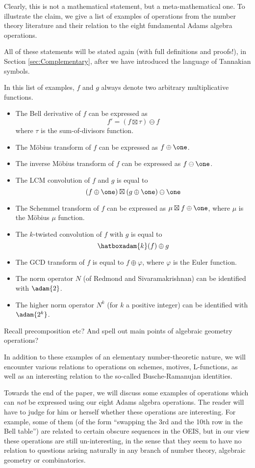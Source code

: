 \documentclass[a4paper]{article}
\begin{document}
Clearly, this is not a mathematical statement, but a meta-mathematical one. To illustrate the claim, we give a list of examples of operations from the number theory literature and their relation to the eight fundamental Adams algebra operations. 

All of these statements will be stated again (with full definitions and proofs!), in Section \ref{sec:Complementary}, after we have introduced the language of Tannakian symbols.

In this list of examples, $f$ and $g$ always denote two arbitrary multiplicative functions.
\begin{itemize}
\item The Bell derivative of $f$ can be expressed as
$$   f' = (f \boxtimes \tau) \ominus  f  $$  
where $\tau$ is the sum-of-divisors function.
\item The M{\"o}bius transform of $f$ can be expressed as $f \oplus \one$.
\item The inverse M{\"o}bius transform of $f$ can be expressed as $f \ominus \one$.
\item The LCM convolution of $f$ and $g$ is equal to 
$$ (f \oplus \one) \boxtimes (g \oplus \one) \ominus \one    $$
\item The Schemmel transform of $f$ can be expressed as $\mu \boxtimes f \oplus \one$, where $\mu$ is the M{\"o}bius $\mu$ function.
\item The $k$-twisted convolution of $f$ with $g$ is equal to 
$$    \hatboxadam{k}(f) \oplus g   $$
\item The GCD transform of $f$ is equal to $f \oplus \varphi$, where $\varphi$ is the Euler function.
\item The norm operator $N$ (of Redmond and Sivaramakrishnan) can be identified with $\adam{2}$.
\item The higher norm operator $N^k$ (for $k$ a positive integer) can be identified with $\adam{2^k}$.
\end{itemize}

Recall precomposition etc? And spell out main points of algebraic geometry operations?

In addition to these examples of an elementary number-theoretic nature, we will encounter various relations to operations on schemes, motives, L-functions, as well as an interesting relation to the so-called Busche-Ramanujan identities. 

Towards the end of the paper, we will discuss some examples of operations which can \emph{not} be expressed using our eight Adams algebra operations. The reader will have to judge for him or herself whether these operations are interesting. For example, some of them (of the form ``swapping the 3rd and the 10th row in the Bell table'') are related to certain obscure sequences in the OEIS, but in our view these operations are still un-interesting, in the sense that they seem to have no relation to questions arising naturally in any branch of number theory, algebraic geometry or combinatorics. 
\end{document}
